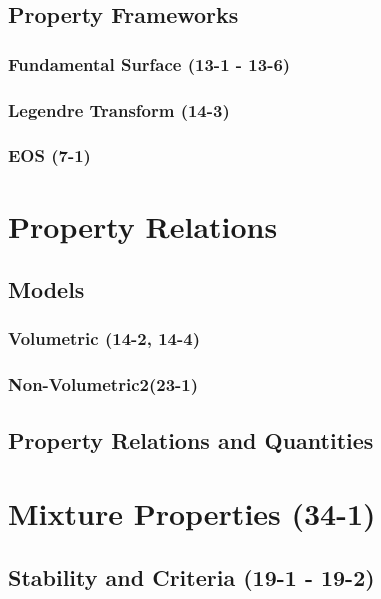 \documentclass{mitqualif}
\begin{document}





\subsection{Property Frameworks}
\subsubsection{Fundamental Surface (13-1 - 13-6)}






\subsubsection{Legendre Transform (14-3)}

\subsubsection{EOS (7-1)}

\section{Property Relations}
\subsection{Models}
\subsubsection{Volumetric (14-2, 14-4)}






\subsubsection{Non-Volumetric2(23-1)}


\subsection{Property Relations and Quantities}
\section{Mixture Properties (34-1)}


\subsection{Stability and Criteria (19-1 - 19-2)}


\end{document}

